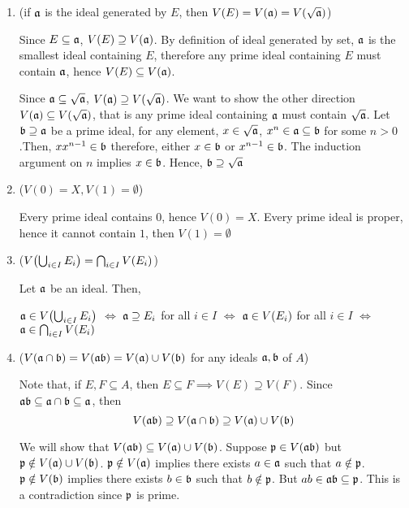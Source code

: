 \begin{longproof}
	\begin{enumerate}
		\item (if $\mathfrak{a}$ is the ideal generated by $E$, then $V(E) = V(\mathfrak{a}) = V(\sqrt{\mathfrak{a}})$)
		
		Since $E \subseteq \mathfrak{a}$, $V(E) \supseteq V(\mathfrak{a})$. By definition of ideal generated by set, $\mathfrak{a}$ is the smallest ideal containing $E$, therefore any prime ideal containing $E$ must contain $\mathfrak{a}$, hence $V(E) \subseteq V(\mathfrak{a})$.
		
		Since $\mathfrak{a} \subseteq \sqrt{\mathfrak{a}}$, $V(\mathfrak{a}) \supseteq V(\sqrt{\mathfrak{a}})$. We want to show the other direction $V(\mathfrak{a}) \subseteq V(\sqrt{\mathfrak{a}})$, that is any prime ideal containing $\mathfrak{a}$ must contain $\sqrt{\mathfrak{a}}$. Let $\mathfrak{b} \supseteq \mathfrak{a}$ be a prime ideal, for any element, $x \in \sqrt{\mathfrak{a}}$, $x^n \in \mathfrak{a} \subseteq \mathfrak{b}$ for some $n > 0$.Then, $x x^{n-1} \in \mathfrak{b}$ therefore, either $x \in \mathfrak{b}$ or $x^{n-1} \in \mathfrak{b}$. The induction argument on $n$ implies $x \in \mathfrak{b}$. Hence, $\mathfrak{b} \supseteq \sqrt{\mathfrak{a}}$
		
		\item ($V(0) = X, V(1) = \emptyset$)
		
		Every prime ideal contains $0$, hence $V(0) = X$. Every prime ideal is proper, hence it cannot contain $1$, then $V(1) = \emptyset$
		
		\item ($V\tuple*{\bigcup_{i \in I} E_i} = \bigcap_{i \in I} V(E_i)$)
		
		Let $\mathfrak{a}$ be an ideal. Then,
		
		$\mf{a} \in V\tuple*{\bigcup_{i \in I} E_i}$ $\iff$ $\mathfrak{a} \supseteq E_i$ for all $i \in I$ $\iff$ $\mathfrak{a} \in V(E_i)$ for all $i \in I$ $\iff$ $\mathfrak{a} \in  \bigcap_{i \in I} V(E_i)$
		
		\item ($V(\mathfrak{a} \cap \mathfrak{b}) = V(\mathfrak{ab}) = V(\mathfrak{a}) \cup V(\mathfrak{b})$ for any ideals $\mathfrak{a}, \mathfrak{b}$ of $A$)
		
		Note that, if $E, F \subseteq A$, then $E \subseteq F \implies V(E) \supseteq V(F)$. Since $\mathfrak{ab} \subseteq \mathfrak{a} \cap \mathfrak{b} \subseteq \mathfrak{a}$, then 
		$$
			V(\mathfrak{ab}) \supseteq V(\mathfrak{a} \cap \mathfrak{b}) \supseteq V(\mathfrak{a}) \cup V(\mathfrak{b})
		$$
		
		We will show that $V(\mathfrak{ab}) \subseteq V(\mathfrak{a}) \cup V(\mathfrak{b})$. Suppose $\mathfrak{p} \in V(\mathfrak{ab})$ but $\mathfrak{p} \notin V(\mathfrak{a}) \cup V(\mathfrak{b})$. $\mathfrak{p} \notin V(\mathfrak{a})$ implies there exists $a \in \mathfrak{a}$ such that $a \notin \mathfrak{p}$. $\mathfrak{p} \notin V(\mathfrak{b})$ implies there exists $b \in \mathfrak{b}$ such that $b \notin \mathfrak{p}$. But $ab \in \mathfrak{ab} \subseteq \mathfrak{p}$. This is a contradiction since $\mathfrak{p}$ is prime.
	\end{enumerate}
\end{longproof}

